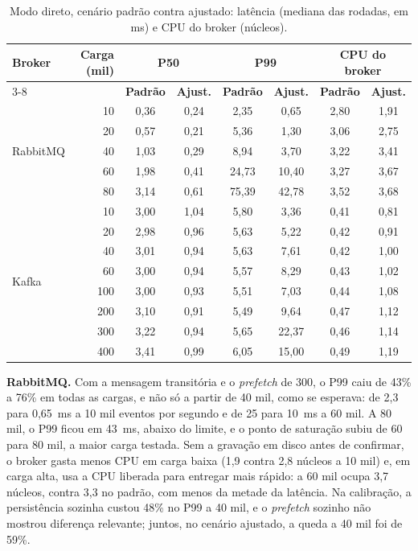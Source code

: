 \documentclass[12pt]{article}
\begin{document}
\begin{table}[ht]
\centering
\caption{Modo direto, cenário padrão contra ajustado: latência (mediana das rodadas, em
ms) e CPU do broker (núcleos).}
\label{tab:ajustado-res}
\small
\begin{tabular}{|l|r|c|c|c|c|c|c|}
\hline
\multirow{2}{*}{\textbf{Broker}} & \multirow{2}{*}{\textbf{Carga (mil)}} & \multicolumn{2}{c|}{\textbf{P50}} & \multicolumn{2}{c|}{\textbf{P99}} & \multicolumn{2}{c|}{\textbf{CPU do broker}} \\
\cline{3-8}
 & & \textbf{Padrão} & \textbf{Ajust.} & \textbf{Padrão} & \textbf{Ajust.} & \textbf{Padrão} & \textbf{Ajust.} \\
\hline
\multirow{5}{*}{RabbitMQ} & 10 & 0,36 & 0,24 & 2,35 & 0,65 & 2,80 & 1,91 \\
 & 20 & 0,57 & 0,21 & 5,36 & 1,30 & 3,06 & 2,75 \\
 & 40 & 1,03 & 0,29 & 8,94 & 3,70 & 3,22 & 3,41 \\
 & 60 & 1,98 & 0,41 & 24,73 & 10,40 & 3,27 & 3,67 \\
 & 80 & 3,14 & 0,61 & 75,39 & 42,78 & 3,52 & 3,68 \\
\hline
\multirow{8}{*}{Kafka} & 10 & 3,00 & 1,04 & 5,80 & 3,36 & 0,41 & 0,81 \\
 & 20 & 2,98 & 0,96 & 5,63 & 5,22 & 0,42 & 0,91 \\
 & 40 & 3,01 & 0,94 & 5,63 & 7,61 & 0,42 & 1,00 \\
 & 60 & 3,00 & 0,94 & 5,57 & 8,29 & 0,43 & 1,02 \\
 & 100 & 3,00 & 0,93 & 5,51 & 7,03 & 0,44 & 1,08 \\
 & 200 & 3,10 & 0,91 & 5,49 & 9,64 & 0,47 & 1,12 \\
 & 300 & 3,22 & 0,94 & 5,65 & 22,37 & 0,46 & 1,14 \\
 & 400 & 3,41 & 0,99 & 6,05 & 15,00 & 0,49 & 1,19 \\
\hline
\end{tabular}
\end{table}

\textbf{RabbitMQ.} Com a mensagem transitória e o \textit{prefetch} de 300, o P99 caiu
de 43\% a 76\% em todas as cargas, e não só a partir de 40 mil, como se esperava: de 2,3
para 0,65~ms a 10 mil eventos por segundo e de 25 para 10~ms a 60 mil. A 80 mil, o P99
ficou em 43~ms, abaixo do limite, e o ponto de saturação subiu de 60 para 80 mil, a
maior carga testada. Sem a gravação em disco antes de confirmar, o broker gasta menos
CPU em carga baixa (1,9 contra 2,8 núcleos a 10 mil) e, em carga alta, usa a CPU
liberada para entregar mais rápido: a 60 mil ocupa 3,7 núcleos, contra 3,3 no padrão,
com menos da metade da latência. Na calibração, a persistência sozinha custou 48\% no
P99 a 40 mil, e o \textit{prefetch} sozinho não mostrou diferença relevante; juntos, no
cenário ajustado, a queda a 40 mil foi de 59\%.
\end{document}
